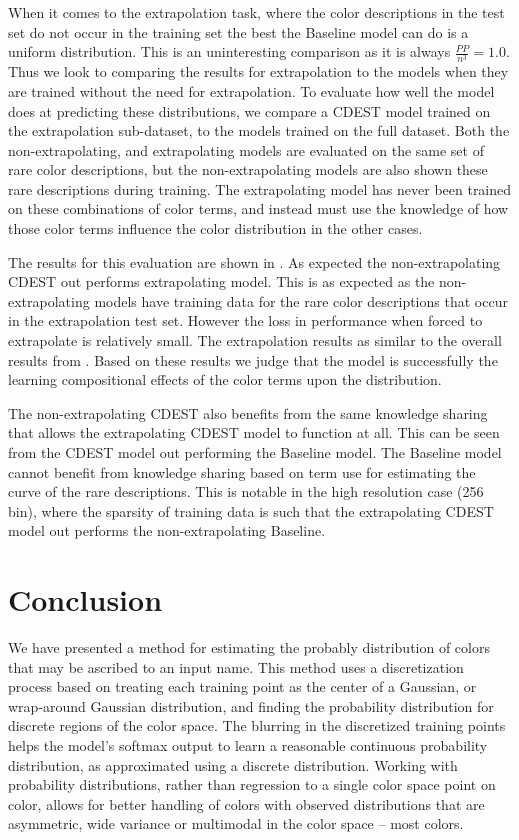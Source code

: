 \documentclass[11pt,letterpaper]{article}
\begin{document}
When it comes to the extrapolation task, where the color descriptions in the test set do not occur in the training set the best the Baseline model can do is a uniform distribution.
This is an uninteresting comparison as it is always $\frac{PP}{n^3}=1.0$.
Thus we look to comparing the results for extrapolation to the models when they are trained without the need for extrapolation.
To evaluate how well the model does at predicting these distributions,
we compare a CDEST model trained on the extrapolation sub-dataset, to the models trained on the full dataset.
Both the non-extrapolating, and extrapolating models are evaluated on the same set of rare color descriptions,
but the non-extrapolating models are also shown these rare descriptions during training.
The extrapolating model has never been trained on these combinations of color terms,
and instead must use the knowledge of how those color terms influence the color distribution in the other cases.

The results for this evaluation are shown in .
As expected the non-extrapolating CDEST out performs extrapolating model.
This is as expected as the non-extrapolating models have training data for the rare color descriptions that occur in the extrapolation test set.
However the loss in performance when forced to extrapolate is relatively small. The extrapolation results as similar to the overall results from .
Based on these results we judge that the model is successfully the learning compositional effects of the color terms upon the distribution.

The non-extrapolating CDEST also benefits from the same knowledge sharing that allows the extrapolating CDEST model to function at all.
This can be seen from the CDEST model out performing the Baseline model.
The Baseline model cannot benefit from knowledge sharing based on term use for estimating the curve of the rare descriptions.
This is notable in the high resolution case (256 bin),
where the sparsity of training data is such that the extrapolating CDEST model out performs the non-extrapolating Baseline.


\section{Conclusion}\label{sec:conclusion}
We have presented a method for estimating the probably distribution of colors that may be ascribed to an input name.
This method uses a discretization process based on treating each training point as the center of a Gaussian, or wrap-around Gaussian distribution, and finding the probability distribution for discrete regions of the color space.
The blurring in the discretized training points helps the model's softmax output to learn a reasonable continuous probability distribution, as approximated using a discrete distribution.
Working with probability distributions, rather than regression to a single color space point on color, allows for better handling of colors with observed distributions that are asymmetric, wide variance or multimodal in the color space -- most colors.
\end{document}
